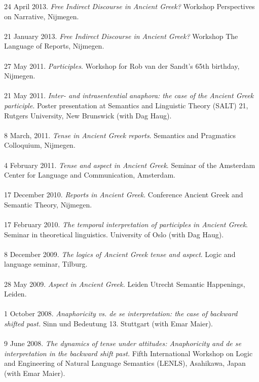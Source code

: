 \documentclass[a4paper,11pt]{article}
\begin{document}
24 April 2013. \emph{Free Indirect Discourse in Ancient Greek?} Workshop Perspectives on Narrative, Nijmegen.\\\\
21 January 2013. \emph{Free Indirect Discourse in Ancient Greek?} Workshop The Language of Reports, Nijmegen.\\\\
27 May 2011. \emph{Participles}. Workshop for Rob van der Sandt's 65th birthday, Nijmegen.\\\\
21 May 2011. \emph{Inter- and intrasentential anaphora: the case of the Ancient Greek participle}. Poster presentation at Semantics and Linguistic Theory (SALT) 21, Rutgers University, New Brunswick (with Dag Haug).\\\\
8 March, 2011. \emph{Tense in Ancient Greek reports}. Semantics and Pragmatics Colloquium, Nijmegen.\\\\
4 February 2011. \emph{Tense and aspect in Ancient Greek}. Seminar of the Amsterdam Center for Language and Communication, Amsterdam.\\\\
17 December 2010. \emph{Reports in Ancient Greek}. Conference Ancient Greek and Semantic Theory, Nijmegen.\\\\ 
17 February 2010. \emph{The temporal interpretation of participles in Ancient Greek}.
Seminar in theoretical linguistics. University of Oslo (with Dag Haug).\\\\
8 December 2009. \emph{The logics of Ancient Greek tense and aspect}. Logic and language seminar, Tilburg.\\\\
28 May 2009. \emph{Aspect in Ancient Greek.} Leiden Utrecht Semantic Happenings, Leiden.\\\\
1 October 2008. \emph{Anaphoricity vs. de se interpretation: the case of backward shifted past.} Sinn und Bedeutung 13. Stuttgart (with Emar Maier).\\\\ 
9 June 2008. \emph{The dynamics of tense under attitudes: Anaphoricity and de se interpretation in the backward shift past.} Fifth International Workshop on Logic and Engineering of Natural Language Semantics (LENLS), Asahikawa, Japan (with Emar Maier).\\\\
\end{document}

